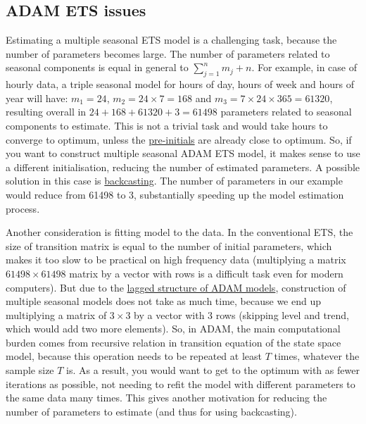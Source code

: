 \documentclass[
]{book}
\theoremstyle{definition}
\theoremstyle{definition}
\theoremstyle{definition}
\theoremstyle{definition}
\theoremstyle{remark}
\begin{document}
\hypertarget{adam-ets-issues}{%
\subsection{ADAM ETS issues}\label{adam-ets-issues}}

Estimating a multiple seasonal ETS model is a challenging task, because the number of parameters becomes large. The number of parameters related to seasonal components is equal in general to \(\sum_{j=1}^n m_j + n\). For example, in case of hourly data, a triple seasonal model for hours of day, hours of week and hours of year will have: \(m_1 = 24\), \(m_2 = 24 \times 7 = 168\) and \(m_3= 7 \times 24 \times 365 = 61320\), resulting overall in \(24 + 168 + 61320 + 3 = 61498\) parameters related to seasonal components to estimate. This is not a trivial task and would take hours to converge to optimum, unless the \protect\hyperlink{ADAMInitialisation}{pre-initials} are already close to optimum. So, if you want to construct multiple seasonal ADAM ETS model, it makes sense to use a different initialisation, reducing the number of estimated parameters. A possible solution in this case is \protect\hyperlink{ADAMInitialisationOptAndBack}{backcasting}. The number of parameters in our example would reduce from 61498 to 3, substantially speeding up the model estimation process.

Another consideration is fitting model to the data. In the conventional ETS, the size of transition matrix is equal to the number of initial parameters, which makes it too slow to be practical on high frequency data (multiplying a matrix \(61498 \times 61498\) matrix by a vector with rows is a difficult task even for modern computers). But due to the \protect\hyperlink{ADAMETSIntroduction}{lagged structure of ADAM models}, construction of multiple seasonal models does not take as much time, because we end up multiplying a matrix of \(3 \times 3\) by a vector with 3 rows (skipping level and trend, which would add two more elements). So, in ADAM, the main computational burden comes from recursive relation in transition equation of the state space model, because this operation needs to be repeated at least \(T\) times, whatever the sample size \(T\) is. As a result, you would want to get to the optimum with as fewer iterations as possible, not needing to refit the model with different parameters to the same data many times. This gives another motivation for reducing the number of parameters to estimate (and thus for using backcasting).
\end{document}
